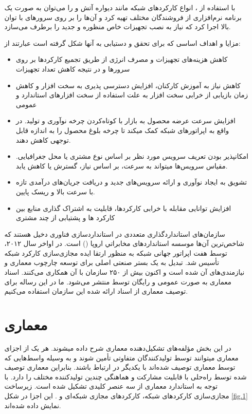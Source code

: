 با استفاده از ، انواع کارکردهای شبکه مانند دیواره آتش و 
را می‌توان به صورت یک برنامه نرم‌افزاری از فروشندگان مختلف تهیه کرد و
آن‌ها را بر روی سرورهای با توان بالا اجرا کرد که نیاز به نصب تجهیزات خاص منظوره و
جدید را برطرف می‌سازد.

مزایا و اهداف اساسی که  برای تحقق و دست‍یابی به آن‍ها شکل گرفته است عبارتند از:

\begin{itemize}
    \item
    کاهش هزینه‌های تجهیزات و مصرف انرژی از طریق تجمیع کارکردها بر روی سرورها و در نتیجه کاهش تعداد تجهیزات
    \item
    کاهش نیاز به آموزش کارکنان، افزایش دسترسی پذیری به سخت افزار و کاهش زمان بازیابی از خرابی سخت افزار به علت استفاده از سخت افزارهای استاندارد و عمومی
    \item
    افزایش سرعت عرضه محصول به بازار با کوتاه‌کردن چرخه نوآوری و تولید. در واقع  به اپراتورهای شبکه کمک می‍کند تا چرخه بلوغ محصول را به اندازه قابل توجهی کاهش دهند.
    \item
    امکان‍پذیر بودن تعریف سرویس مورد نظر بر اساس نوع مشتری یا محل جغرافیایی. مقیاس سرویس‌ها می‍تواند به سرعت، بر اساس نیاز، گسترش یا کاهش یابد.
    \item
    تشویق به ایجاد نوآوری و ارائه سرویس‌های جدید و دریافت جریان‌های درآمدی تازه با سرعت بالا و ریسک پایین.
    \item
    افزایش توانایی  مقابله با خرابی کارکردها، قابلیت به اشتراک گذاری منابع بین کارکرد ها و پشتیابی از چند مشتری
\end{itemize}

سازمان‌های استانداردگذاری متعددی در استانداردسازی فناوری  دخیل هستند که شاخص‌ترین آن‌ها موسسه استانداردهای مخابراتي اروپا () است.
در اواخر سال ۲۰۱۲،
توسط هفت اپراتور جهانی شبکه به منظور ارتقا ایده مجازی‌سازی کارکرد شبکه تأسیس شد.
تبدیل به یک بستر صنعتی اصلی برای توسعه چارچوب معماری  و نیازمندی‌های آن شده است و اکنون بیش از ۲۵۰ سازمان با آن همکاری می‌کنند.
اسناد معماری  به صورت عمومی و رایگان توسط  منتشر می‌شود.
ما در این رساله برای توصیف معماری  از اسناد ارائه شده این سازمان استفاده می‌کنیم.

\section{معماری }

در این بخش مؤلفه‌های تشکیل‌دهنده معماری  شرح داده می‍شوند.
هر یک از اجزای معماری می‍توانند توسط تولیدکنندگان متفاوتی تأمین شوند و به وسیله واسط‌هایی که توسط معماری 
توصیف شده‌اند با یکدیگر در ارتباط باشند.
بنابراین معماری  توصیف شده توسط  راه‌حلی با قابلیت مشارکت و هماهنگی چندین تولیدکننده مختلف را دارد.
با توجه به استاندارد  معماری 
از سه عنصر کلیدی تشکیل شده است.
زیرساخت مجازی‌سازی کارکردهای شبکه،
کارکردهای مجازی شبکه‌ای و
.
این اجزا در شکل \ref{fig.1} نمایش داده شده‌اند.

